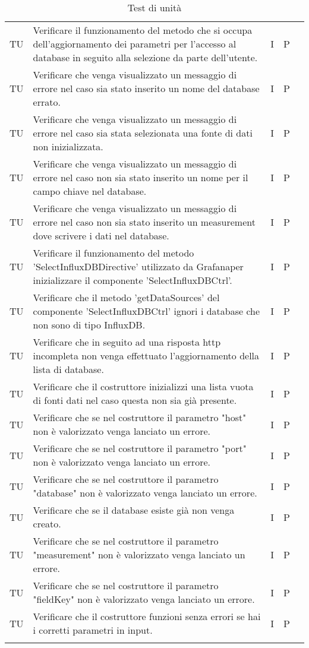 \begin{longtable} {
		>{}p{15mm} 
		>{}p{79.5mm}
		>{}p{15mm} 
		>{}p{15mm}
		>{}p{0mm}}
	TU		& Verificare il funzionamento del metodo che si occupa dell'aggiornamento dei parametri per l'accesso al database in seguito alla selezione da parte dell'utente.& I & P &\TBstrut \\ [2mm]
	TU		& Verificare che venga visualizzato un messaggio di errore nel caso sia stato inserito un nome del database errato.& I & P &\TBstrut \\ [2mm]
	TU		& Verificare che venga visualizzato un messaggio di errore nel caso sia stata selezionata una fonte di dati non inizializzata.& I & P &\TBstrut \\ [2mm]
	TU		& Verificare che venga visualizzato un messaggio di errore nel caso non sia stato inserito un nome per il campo chiave nel database.& I & P &\TBstrut \\ [2mm]
	TU		& Verificare che venga visualizzato un messaggio di errore nel caso non sia stato inserito un measurement dove scrivere i dati nel database.& I & P &\TBstrut \\ [2mm]
	TU		& Verificare il funzionamento del metodo 'SelectInfluxDBDirective' utilizzato da Grafana\glosp per inizializzare il componente 'SelectInfluxDBCtrl'.& I & P &\TBstrut \\ [2mm]
	TU		& Verificare che il metodo 'getDataSources' del componente 'SelectInfluxDBCtrl' ignori i database che non sono di tipo InfluxDB.& I & P &\TBstrut \\ [2mm]
	TU		& Verificare che in seguito ad una risposta http incompleta non venga effettuato l'aggiornamento della lista di database.& I & P &\TBstrut \\ [2mm]
	TU		& Verificare che il costruttore inizializzi una lista vuota di fonti dati nel caso questa non sia già presente.& I & P &\TBstrut \\ [2mm]
	TU		& Verificare che se nel costruttore il parametro "host" non è valorizzato venga lanciato un errore.& I & P &\TBstrut \\ [2mm]
	TU		& Verificare che se nel costruttore il parametro "port" non è valorizzato venga lanciato un errore.& I & P &\TBstrut \\ [2mm]
	TU		& Verificare che se nel costruttore il parametro "database" non è valorizzato venga lanciato un errore.& I & P &\TBstrut \\ [2mm]
	TU		& Verificare che se il database esiste già non venga creato.& I & P &\TBstrut \\ [2mm]
	TU		& Verificare che se nel costruttore il parametro "measurement" non è valorizzato venga lanciato un errore.& I & P &\TBstrut \\ [2mm]
	TU		& Verificare che se nel costruttore il parametro "fieldKey" non è valorizzato venga lanciato un errore.& I & P &\TBstrut \\ [2mm]
	TU		& Verificare che il costruttore funzioni senza errori se hai i corretti parametri in input.& I & P &\TBstrut \\ [2mm]
	
	
	\rowcolor{white}
	\caption{Test di unità}
\end{longtable}
